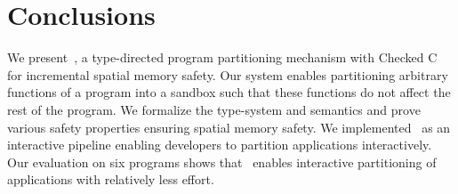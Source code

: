 \section{Conclusions}
\label{sec:conclude}
We present~\systemname{}, a type-directed program partitioning mechanism with Checked C for incremental spatial memory safety.
Our system enables partitioning arbitrary functions of a program into a sandbox such that these functions do not affect the rest of the program.
We formalize the type-system and semantics and prove various safety properties ensuring spatial memory safety.
We implemented~\systemname{} as an interactive pipeline enabling developers to partition applications interactively.
Our evaluation on six programs shows that~\systemname{} enables interactive partitioning of applications with relatively less effort.

%

